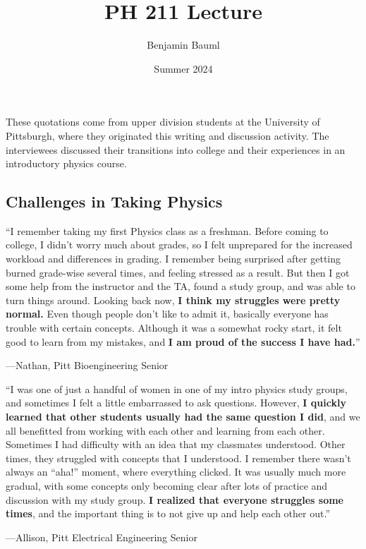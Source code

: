 \documentclass[]{article}
\title{PH 211 Lecture \Week}
\author{Benjamin Bauml}
\date{Summer 2024}
\begin{document}
\begin{TeacherMargin}
\VolReps
\VolRepsA
\VolRepsASol
\VolRepsB
\VolRepsBSol
\VolRepsC
\vspace{-10pt}
\VolRepsCSol
\vspace{-10pt}
\VolRepsD
\VolRepsDSol
\end{TeacherMargin}
\begin{PresentSpace}
\addtocounter{ActNumber}{-1}
\VolReps
\VolRepsA
\VolRepsB
\VolRepsC
\VolRepsD
\end{PresentSpace}
\newpage
\begin{TeacherMargin}
These quotations come from upper division students at the University of Pittsburgh, where they originated this writing and discussion activity. The interviewees discussed their transitions into college and their experiences in an introductory physics course.
\end{TeacherMargin}
\begin{PresentSpace}
\section*{Challenges in Taking Physics}
``I remember taking my first Physics class as a freshman.
Before coming to college, I didn't worry much about
grades, so I felt unprepared for the increased workload
and differences in grading. I remember being surprised
after getting burned grade-wise several times, and
feeling stressed as a result. But then I got some help
from the instructor and the TA, found a study group, and
was able to turn things around. Looking back now, \textbf{I
think my struggles were pretty normal.} Even though
people don't like to admit it, basically everyone has
trouble with certain concepts. Although it was a
somewhat rocky start, it felt good to learn from my
mistakes, and \textbf{I am proud of the success I have had.}''
\begin{flushright}
---Nathan, Pitt Bioengineering Senior
\end{flushright}
``I was one of just a handful of women in one of my intro physics
study groups, and sometimes I felt a little embarrassed to ask
questions. However, \textbf{I quickly learned that other students
usually had the same question I did}, and we all benefitted
from working with each other and learning from each other.
Sometimes I had difficulty with an idea that my classmates
understood. Other times, they struggled with concepts that I
understood. I remember there wasn’t always an ``aha!'' moment,
where everything clicked. It was usually much more gradual,
with some concepts only becoming clear after lots of practice
and discussion with my study group. \textbf{I realized that everyone
struggles some times}, and the important thing is to not give
up and help each other out.”
\begin{flushright}
---Allison, Pitt Electrical Engineering Senior
\end{flushright}
\end{PresentSpace}
\end{document}
